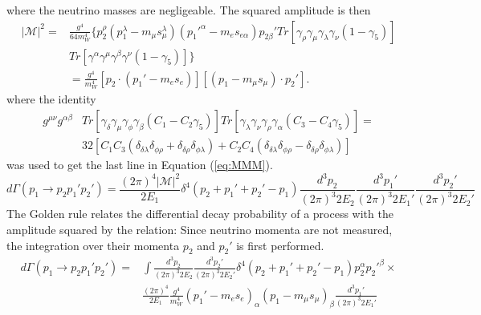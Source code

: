 \documentclass{outhesis}
\begin{document}
where the neutrino masses are negligeable. The squared amplitude is then
\begin{equation}
\begin{split}
|\mathcal{M}|^2  = & \frac{g^4}{64 m_W^4} \{p_2^{\rho}\left(p_1^{\lambda}-m_{\mu}s_{\mu}^{\lambda}\right)\left(p_1'^{\alpha}-m_{e}s_{e\alpha}\right)p_{2\beta}'Tr[\gamma_{\rho}\gamma_{\mu}
\gamma_{\lambda}\gamma_{\nu}\left(1-\gamma_5\right) ]  \\
& Tr[\gamma^{\alpha}\gamma^{\mu}\gamma^{\beta}\gamma^{\nu}\left(1-\gamma_5\right)]    \}\\
& = \frac{g^4}{m_W^4}[p_2\cdot\left(p_1'-m_e s_e \right) ] [\left(p_1 - m_{\mu}s_{\mu}\right) \cdot p_2'  ].  
\label{eq:MMM}
\end{split}
\end{equation}
where the identity 
\begin{equation}
\begin{split}
g^{\mu \nu}g^{\alpha \beta} &Tr[\gamma_{\delta}\gamma_{\mu}\gamma_{\phi}\gamma_{\beta}\left(C_1-C_2\gamma_5\right)] 
Tr[\gamma_{\lambda}\gamma_{\nu}\gamma_{\rho}\gamma_{\alpha}\left(C_3-C_4\gamma_5\right)] = \\
&32[C_1C_3\left(\delta_{\delta\lambda}\delta_{\phi\rho}+\delta_{\delta\rho}\delta_{\phi\lambda} \right)
+ C_2 C_4 \left(\delta_{\delta\lambda}\delta_{\phi\rho}-\delta_{\delta\rho}\delta_{\phi\lambda}\right)]
\end{split}
\end{equation}
was used to get the last line in Equation (\ref{eq:MMM}).
\begin{equation}
d\Gamma\left(p_1\to p_2p_1'p_2'\right) = \frac{\left(2\pi\right)^4 |\mathcal{M}|^2}{2E_1}\delta^4\left(p_2+p_1'+p_2'-p_1 \right)
\frac{d^3p_2}{\left(2\pi\right)^3 2E_2}\frac{d^3p_1'}{\left(2\pi\right)^3 2E_1'}\frac{d^3p_2'}{\left(2\pi\right)^3 2E_2'}
\end{equation}
The Golden rule relates the differential decay probability of a process with the amplitude squared by the relation:
Since neutrino momenta are not measured, the integration over their momenta $p_2$ and $p_2'$ is first performed. 
\begin{equation}
\label{eq:dnus}
\begin{split}
d\Gamma\left(p_1\to p_2p_1'p_2'\right) = &\int\frac{d^3p_2}{\left(2\pi\right)^3 2E_2}\frac{d^3p_2'}{\left(2\pi\right)^3 2E_2'}\delta^4\left(p_2+p_1'+p_2'-p_1 \right)p_2^\alpha p_2'^\beta 
\times \\
& \frac{\left(2\pi\right)^4}{2E_1} \frac{g^4}{m_W^4} \left(p_1'-m_e s_e \right)_\alpha \left(p_1 - m_{\mu}s_{\mu}\right)_\beta
\frac{d^3p_1'}{\left(2\pi\right)^3 2E_1'}
\end{split}
\end{equation}
\end{document}
